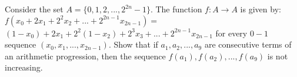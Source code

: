 Consider the set $A = \{0, 1, 2, . . . , 2^{2n} - 1\}$. The function $f : A \rightarrow A$ is given by: $f(x_0 + 2x_1 + 2^2x_2 + ... + 2^{2n-1}x_{2n-1})=$$(1 - x_0) + 2x_1 + 2^2(1 - x_2) + 2^3x_3 + ... + 2^{2n-1}x_{2n-1}$
for every $0-1$ sequence $(x_0, x_1, . . . , x_{2n-1})$. Show that if $a_1, a_2, . . . , a_9$ are consecutive terms of an arithmetic progression, then the sequence $f(a_1), f(a_2), . . . , f(a_9)$ is not increasing.